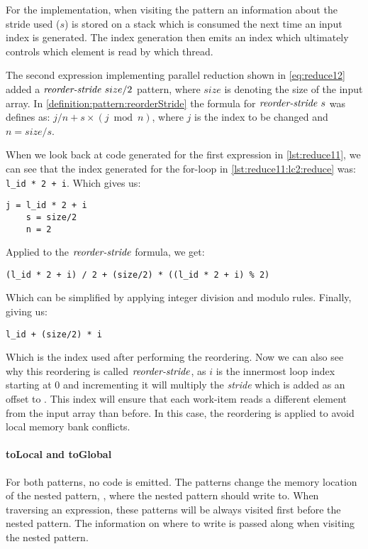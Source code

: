 For the implementation, when visiting the \reorderStride pattern an information about the stride used ($s$) is stored on a stack which is consumed the next time an input index is generated.
The index generation then emits an index which ultimately controls which element is read by which thread.

The second expression implementing parallel reduction shown in \autoref{eq:reduce12} added a $\text{\textit{reorder-stride}}\ size/2$ pattern, where $size$ is denoting the size of the input array.
In \autoref{definition:pattern:reorderStride} the formula for $\text{\textit{reorder-stride}}\ s$ was defines as: $j / n + s \times (j \bmod{n})$, where $j$ is the index to be changed and $n = size / s$.

When we look back at \OpenCL code generated for the first expression in \autoref{lst:reduce11}, we can see that the index generated for the for-loop in \autoref{lst:reduce11:lc2:reduce} was:
\lstinline!l_id * 2 + i!.
Which gives us:
\begin{lstlisting}[numbers=none, frame=none]
    j = l_id * 2 + i
    s = size/2
    n = 2
\end{lstlisting}
Applied to the $\text{\textit{reorder-stride}}$ formula, we get:
\begin{lstlisting}[numbers=none, frame=none]
    (l_id * 2 + i) / 2 + (size/2) * ((l_id * 2 + i) % 2)
\end{lstlisting}
Which can be simplified by applying integer division and modulo rules. Finally, giving us:
\begin{lstlisting}[numbers=none, frame=none]
    l_id + (size/2) * i
\end{lstlisting}
Which is the index used after performing the reordering.
Now we can also see why this reordering is called $\text{\textit{reorder-stride}}$, as $i$ is the innermost loop index starting at $0$ and incrementing it will multiply the \emph{stride} which is added as an offset to .
This index will ensure that each work-item reads a different element from the input array than before.
In this case, the reordering is applied to avoid local memory bank conflicts.

\paragraph{{\footnotesize to}Local and {\footnotesize to}Global}
For both patterns, no \OpenCL code is emitted.
The patterns change the memory location of the nested pattern, \ie, where the nested pattern should write to.
When traversing an expression, these patterns will be always visited first before the nested pattern.
The information on where to write is passed along when visiting the nested pattern.

